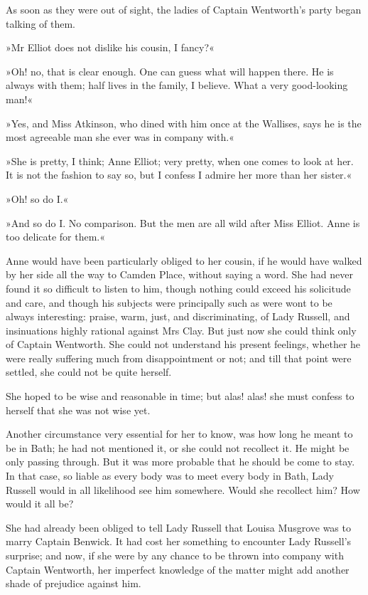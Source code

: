 As soon as they were out of sight, the ladies of Captain Wentworth's party began talking of them.

»Mr Elliot does not dislike his cousin, I fancy?«

»Oh! no, that is clear enough. One can guess what will happen there. He is always with them; half lives in the family, I believe. What a very good-looking man!«

»Yes, and Miss Atkinson, who dined with him once at the Wallises, says he is the most agreeable man she ever was in company with.«

»She is pretty, I think; Anne Elliot; very pretty, when one comes to look at her. It is not the fashion to say so, but I confess I admire her more than her sister.«

»Oh! so do I.«

»And so do I. No comparison. But the men are all wild after Miss Elliot. Anne is too delicate for them.«

Anne would have been particularly obliged to her cousin, if he would have walked by her side all the way to Camden Place, without saying a word. She had never found it so difficult to listen to him, though nothing could exceed his solicitude and care, and though his subjects were principally such as were wont to be always interesting: praise, warm, just, and discriminating, of Lady Russell, and insinuations highly rational against Mrs Clay. But just now she could think only of Captain Wentworth. She could not understand his present feelings, whether he were really suffering much from disappointment or not; and till that point were settled, she could not be quite herself.

She hoped to be wise and reasonable in time; but alas! alas! she must confess to herself that she was not wise yet.

Another circumstance very essential for her to know, was how long he meant to be in Bath; he had not mentioned it, or she could not recollect it. He might be only passing through. But it was more probable that he should be come to stay. In that case, so liable as every body was to meet every body in Bath, Lady Russell would in all likelihood see him somewhere. Would she recollect him? How would it all be?

She had already been obliged to tell Lady Russell that Louisa Musgrove was to marry Captain Benwick. It had cost her something to encounter Lady Russell's surprise; and now, if she were by any chance to be thrown into company with Captain Wentworth, her imperfect knowledge of the matter might add another shade of prejudice against him.

